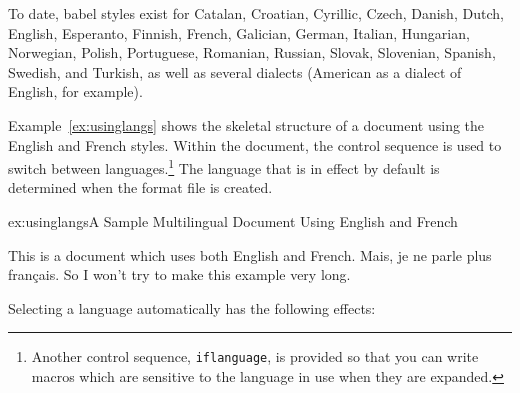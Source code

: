To date, babel styles exist for 
Catalan,        Croatian,       Cyrillic,       Czech,
Danish,         Dutch,          English,        Esperanto,
Finnish,        French,         Galician,       German,
Italian,        Hungarian,      Norwegian,      Polish,
Portuguese,      Romanian,       Russian,        Slovak,
Slovenian,      Spanish,        Swedish,  and   Turkish,
as well as several dialects (American as a dialect of English,
for example).

Example~\ref{ex:usinglangs} shows the skeletal
structure of a document using the English and French styles.  Within the
document, the  control sequence is used
to switch
between languages.\footnote{Another control sequence,
\texttt{\ttbackslash iflanguage}, is provided so that you can write macros
which are sensitive to the language in use when they are expanded.}  
The language that is in effect by default
is determined when the format file is created.

\newpage
\begin{example}{ex:usinglangs}{A Sample Multilingual Document 
    Using English and French}

This is a document which uses both English and 
French.  Mais, je ne parle plus 
fran\c{c}ais.   So I won't try 
to make this example very long.

\end{example}

Selecting a language automatically has the following effects:

